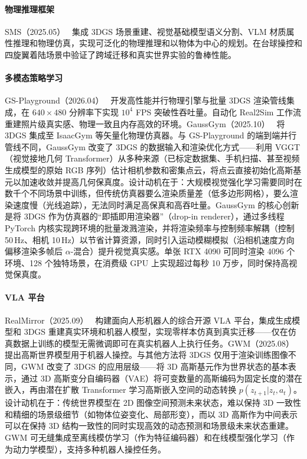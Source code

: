 \paragraph{物理推理框架}

SMS（2025.05）~\cite{2505_14938} 集成 3DGS 场景重建、视觉基础模型语义分割、VLM 材质属性推理和物理仿真，实现可泛化的物理推理和以物体为中心的规划。在台球操控和四旋翼着陆场景中验证了跨域迁移和真实世界实验的鲁棒性能。

\paragraph{多模态策略学习}

GS-Playground（2026.04）~\cite{2604_25459} 开发高性能并行物理引擎与批量 3DGS 渲染管线集成，在 $640\times480$ 分辨率下实现 $10^4$ FPS 突破性吞吐量。自动化 Real2Sim 工作流重建照片级真实感、物理一致且内存高效的环境。GaussGym（2025.10）~\cite{2510_15352} 将 3DGS 集成至 IsaacGym 等矢量化物理仿真器。与 GS-Playground 的端到端并行管线不同，GaussGym 改变了 3DGS 的数据输入和渲染优化方式——利用 VGGT（视觉接地几何 Transformer）从多种来源（已标定数据集、手机扫描、甚至视频生成模型的原始 RGB 序列）估计相机参数和密集点云，将点云直接初始化高斯基元以加速收敛并提高几何保真度。设计动机在于：大规模视觉强化学习需要同时在数千个不同场景中训练，但传统仿真器要么渲染质量差（低多边形网格），要么渲染速度慢（光线追踪），无法同时满足高保真和高吞吐量。GaussGym 的核心创新是将 3DGS 作为仿真器的``即插即用渲染器''（drop-in renderer），通过多线程 PyTorch 内核实现跨环境的批量泼溅渲染，并将渲染频率与控制频率解耦（控制 50\,Hz、相机 10\,Hz）以节省计算资源，同时引入运动模糊模拟（沿相机速度方向偏移渲染多帧后 $\alpha$-混合）提升视觉真实感。单张 RTX 4090 可同时渲染 4096 个环境、128 个独特场景，在消费级 GPU 上实现超过每秒 10 万步，同时保持高视觉保真度。

\paragraph{VLA 平台}

RealMirror（2025.09）~\cite{2509_14687} 构建面向人形机器人的综合开源 VLA 平台，集成生成模型和 3DGS 重建真实环境和机器人模型，实现零样本仿真到真实迁移——仅在仿真数据上训练的模型无需微调即可在真实机器人上执行任务。GWM（2025.08）~\cite{2508_17600} 提出高斯世界模型用于机器人操控。与其他方法将 3DGS 仅用于渲染训练图像不同，GWM 改变了 3DGS 的应用层级——将 3D 高斯基元作为世界状态的基本表示，通过 3D 高斯变分自编码器（VAE）将可变数量的高斯编码为固定长度的潜在嵌入，再由潜在扩散 Transformer 学习高斯嵌入空间的动态转换 $p(z_{t+1} | z_t, a_t)$。设计动机在于：传统世界模型在 2D 图像空间预测未来状态，难以保持 3D 一致性和精细的场景级细节（如物体位姿变化、局部形变），而以 3D 高斯作为中间表示可以在保持 3D 结构一致性的同时实现高效的动态预测和场景级未来状态重建。GWM 可无缝集成至离线模仿学习（作为特征编码器）和在线模型强化学习（作为动力学模型），支持多种机器人操控任务。

